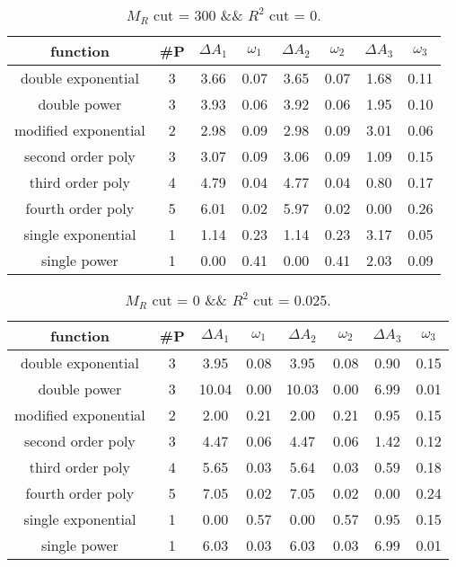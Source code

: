  
\begin{table}[H] 
\begin{center} 
\begin{tabular}{|c|c|cc|cc|cc|} 
\hline function & \#P & $\Delta A_1$ & $\omega_1$ & $\Delta A_2$ & $\omega_2$ & $\Delta A_3$ & $\omega_3$ \\ \hline 
double exponential &  3 &   3.66 &   0.07 &   3.65 &   0.07 &   1.68 &   0.11 \\ 
double power &  3 &   3.93 &   0.06 &   3.92 &   0.06 &   1.95 &   0.10 \\ 
modified exponential &  2 &   2.98 &   0.09 &   2.98 &   0.09 &   3.01 &   0.06 \\ 
second order poly &  3 &   3.07 &   0.09 &   3.06 &   0.09 &   1.09 &   0.15 \\ 
third order poly &  4 &   4.79 &   0.04 &   4.77 &   0.04 &   0.80 &   0.17 \\ 
fourth order poly &  5 &   6.01 &   0.02 &   5.97 &   0.02 &   0.00 &   0.26 \\ 
single exponential &  1 &   1.14 &   0.23 &   1.14 &   0.23 &   3.17 &   0.05 \\ 
single power &  1 &   0.00 &   0.41 &   0.00 &   0.41 &   2.03 &   0.09 \\ 
\hline 
\end{tabular} 
\caption{$M_R$ cut = 300 \&\& $R^2$ cut = 0.} 
\label{tab:FitChoices_300_0} 
\end{center} 
\end{table} 
 
 
\begin{table}[H] 
\begin{center} 
\begin{tabular}{|c|c|cc|cc|cc|} 
\hline function & \#P & $\Delta A_1$ & $\omega_1$ & $\Delta A_2$ & $\omega_2$ & $\Delta A_3$ & $\omega_3$ \\ \hline 
double exponential &  3 &   3.95 &   0.08 &   3.95 &   0.08 &   0.90 &   0.15 \\ 
double power &  3 &  10.04 &   0.00 &  10.03 &   0.00 &   6.99 &   0.01 \\ 
modified exponential &  2 &   2.00 &   0.21 &   2.00 &   0.21 &   0.95 &   0.15 \\ 
second order poly &  3 &   4.47 &   0.06 &   4.47 &   0.06 &   1.42 &   0.12 \\ 
third order poly &  4 &   5.65 &   0.03 &   5.64 &   0.03 &   0.59 &   0.18 \\ 
fourth order poly &  5 &   7.05 &   0.02 &   7.05 &   0.02 &   0.00 &   0.24 \\ 
single exponential &  1 &   0.00 &   0.57 &   0.00 &   0.57 &   0.95 &   0.15 \\ 
single power &  1 &   6.03 &   0.03 &   6.03 &   0.03 &   6.99 &   0.01 \\ 
\hline 
\end{tabular} 
\caption{$M_R$ cut = 0 \&\& $R^2$ cut = 0.025.} 
\label{tab:FitChoices_0_0.025} 
\end{center} 
\end{table} 
 
